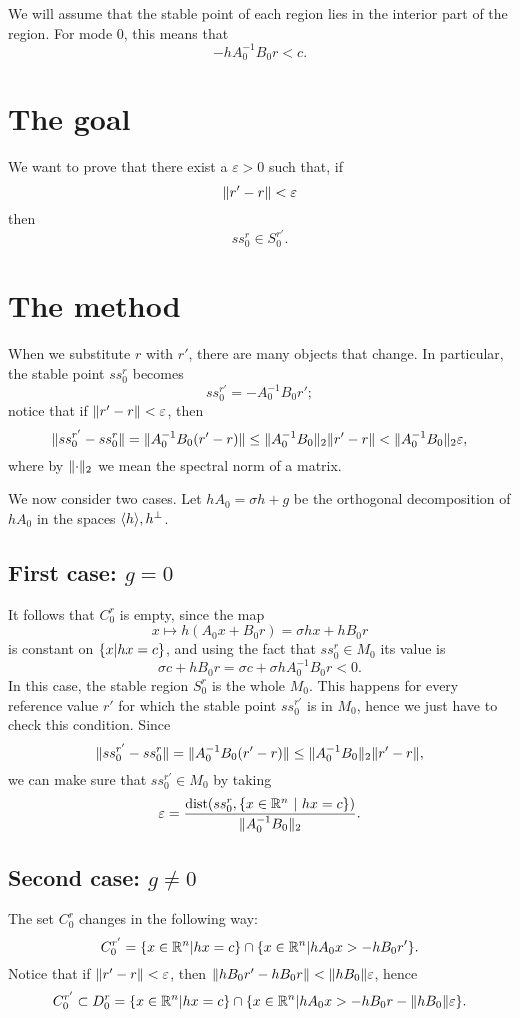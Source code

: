 \documentclass{article}
\theoremstyle{definition}
\DeclarePairedDelimiter{\set}{\{}{\}}
\DeclarePairedDelimiter{\norm}{\lVert }{\rVert}
\DeclarePairedDelimiter{\spam}{\langle}{\rangle}
\newcommand{\R}{\mathbb{R}}
\renewcommand{\epsilon}{\varepsilon}
\DeclareMathOperator{\dist}{dist}
\begin{document}
We will assume that the stable point of each region lies in the interior part of the region. For mode 0, this means that 
    \[ -hA_0^{-1} B_0 r < c. \]
\section{The goal}

We want to prove that there exist a $\epsilon > 0$ such that, if
\[ \norm{r' - r} < \epsilon  \]
then
\[ ss_0^{r} \in S_0^{r'}.\]




\section{The method}


When we substitute $r$ with $r'$, there are many objects that change. In particular, the stable point $ss_0^r$ becomes
    \[ ss_0^{r'} = - A_0^{-1}B_0{r'};  \]
    notice that if $\norm{r' - r} < \epsilon$, then  \[\norm{ss_0^{r'} - ss_0^r} = \norm{A_0^{-1}B_0(r'-r)} \leq \norm{A_0^{-1}B_0}_2 \norm{r' - r} < \norm{A_0^{-1}B_0}_2 \epsilon,\] where by $\norm{\cdot}_2 $ we mean the spectral norm of a matrix.
    
    We now consider two cases. Let $hA_0 = \sigma h + g$ be the orthogonal decomposition of $hA_0$ in the spaces $\spam{h}, h^\perp$. 
    
    \subsection{First case: $g = 0$}  It follows that $C_0^r$ is empty, since the map
    \[ x \longmapsto  h(A_0 x + B_0 r) = \sigma h x + h B_0 r \]
    is constant on $\set{x | hx=c  }$, and using the fact that $ss_0^r \in M_0$ its value is
    \[ \sigma c + h B_0 r = \sigma c + \sigma h A_0^{-1} B_0 r < 0. \]
    In this case, the stable region $S_0^r$ is the whole $M_0$. This happens for every reference value $r'$ for which the stable point $ss_0^{r'}$ is in $M_0$, hence we just have to check this condition.
    Since \[\norm{ss_0^{r'} - ss_0^r} = \norm{A_0^{-1}B_0(r'-r)} \leq \norm{A_0^{-1}B_0}_2 \norm{r' - r}, \]
    we can make sure that $ss_0^{r'} \in M_0$ by taking
    \[ \epsilon =  \frac{ \dist(ss_0^r, \set{x \in \R^n \ | \ hx = c})} {\norm{A_0^{-1} B_0}_2 } .\]

    
    \subsection{Second case: $g \neq 0$} The set $C_0^{r}$ changes in the following way:
    \[ C_0^{r'} = \set{ x \in \R^n | hx = c} \cap \set{ x \in \R^n |  h A_0 x > - h B_0 r'   }. \]
    Notice that if $\norm{r' - r} < \epsilon$, then  $\norm{h B_0 r' - h B_0 r} < \norm{h B_0} \epsilon $, hence 
    \[ C_0^{r'} \subset D_0^{r} = \set{ x \in \R^n | hx = c} \cap \set{ x \in \R^n |  h A_0 x > - h B_0 r -  \norm{h B_0} \epsilon }. \]
    
\end{document}
